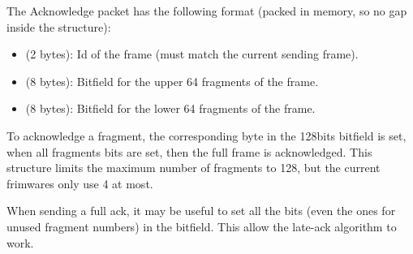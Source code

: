 The Acknowledge packet has the following format (packed in memory, so no gap inside the structure):
\begin{itemize}
\item{ (2 bytes): Id of the frame (must match the current sending frame).}
\item{ (8 bytes): Bitfield for the upper 64 fragments of the frame.}
\item{ (8 bytes): Bitfield for the lower 64 fragments of the frame.}
\end{itemize}

To acknowledge a fragment, the corresponding byte in the 128bits bitfield is set, when all fragments bits are set, then the full frame is acknowledged. This structure limits the maximum number of fragments to 128, but the current frimwares only use 4 at most.

When sending a full ack, it may be useful to set all the bits (even the ones for unused fragment numbers) in the bitfield. This allow the  late-ack algorithm to work.


